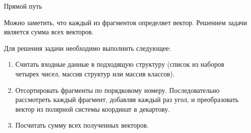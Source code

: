 \begin{tutorial}{Прямой путь}

Можно заметить, что каждый из фрагментов определяет вектор. Решением задачи является сумма всех векторов.

\sloppy
Для решения задачи необходимо выполнить следующее:
\begin{enumerate}
\item Считать входные данные в подходящую структуру (список из наборов четырех чисел, массив структур или массив классов).
\item Отсортировать фрагменты по порядковому номеру.
Последовательно рассмотреть каждый фрагмент, добавляя каждый раз угол, и преобразовать вектор из полярной системы координат в декартову.
\item Посчитать сумму всех полученных векторов.
\end{enumerate}

\end{tutorial}

